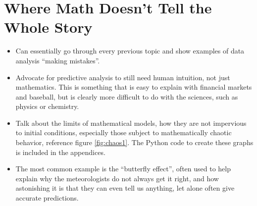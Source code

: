 \documentclass[12pt,twoside]{book}
\begin{document}
	\chapter[When the Numbers Lie]{Where Math Doesn't Tell the Whole Story}
	\begin{itemize}
		\item Can essentially go through every previous topic and show examples of data analysis ``making mistakes''.
		\item Advocate for predictive analysis to still need human intuition, not just mathematics.  This is something that is easy to explain with financial markets and baseball, but is clearly more difficult to do with the sciences, such as physics or chemistry.
		\item Talk about the limits of mathematical models, how they are not impervious to initial conditions, especially those subject to mathematically chaotic behavior, reference figure \ref{fig:chaos1}. The Python code to create these graphs is included in the appendices.
		\item The most common example is the ``butterfly effect'', often used to help explain why the meteorologists do not always get it right, and how astonishing it is that they can even tell us anything, let alone often give accurate predictions.
	\end{itemize}
\end{document}
